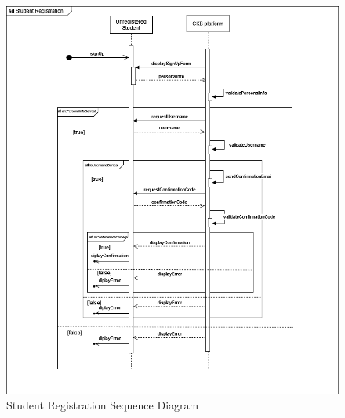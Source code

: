\begin{center}
        \begin{figure} [H]
            \begin{center}
                \includegraphics[width=0.9\linewidth]{Images/SequenceDiagrams/SD_1.png}
                \caption{Student Registration Sequence Diagram}
                \label{fig: student_registration_seq_diag}
            \end{center}
        \end{figure}
        
\end{center}

